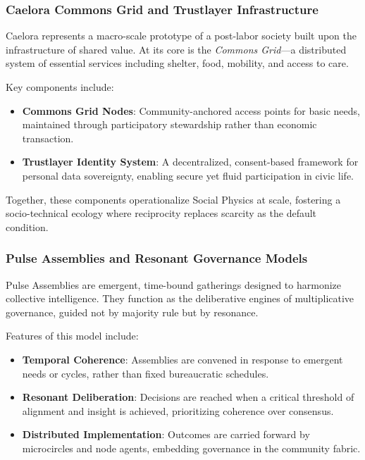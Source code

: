 \documentclass{article}
\theoremstyle{plain}
\theoremstyle{claimstyle}
\begin{document}
\subsubsection{Caelora Commons Grid and Trustlayer Infrastructure}

Caelora represents a macro-scale prototype of a post-labor society built upon the infrastructure of shared value. At its core is the \textit{Commons Grid}—a distributed system of essential services including shelter, food, mobility, and access to care.

Key components include:

\begin{itemize}
    \item \textbf{Commons Grid Nodes}: Community-anchored access points for basic needs, maintained through participatory stewardship rather than economic transaction.
    \item \textbf{Trustlayer Identity System}: A decentralized, consent-based framework for personal data sovereignty, enabling secure yet fluid participation in civic life.
\end{itemize}

Together, these components operationalize Social Physics at scale, fostering a socio-technical ecology where reciprocity replaces scarcity as the default condition.

\subsubsection{Pulse Assemblies and Resonant Governance Models}

Pulse Assemblies are emergent, time-bound gatherings designed to harmonize collective intelligence. They function as the deliberative engines of multiplicative governance, guided not by majority rule but by resonance.

Features of this model include:

\begin{itemize}
    \item \textbf{Temporal Coherence}: Assemblies are convened in response to emergent needs or cycles, rather than fixed bureaucratic schedules.
    \item \textbf{Resonant Deliberation}: Decisions are reached when a critical threshold of alignment and insight is achieved, prioritizing coherence over consensus.
    \item \textbf{Distributed Implementation}: Outcomes are carried forward by microcircles and node agents, embedding governance in the community fabric.
\end{itemize}
\end{document}
